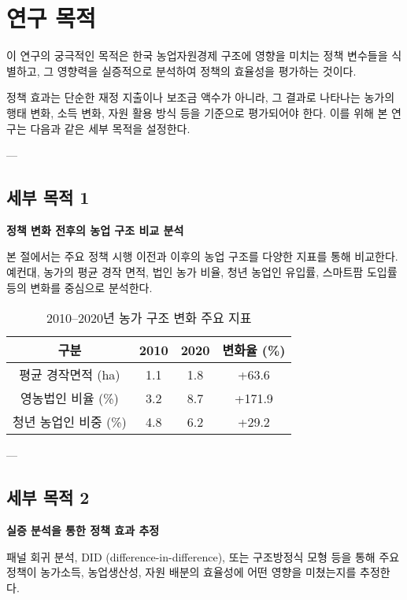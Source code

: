 \section{연구 목적}

이 연구의 궁극적인 목적은 한국 농업자원경제 구조에 영향을 미치는 정책 변수들을 식별하고,  
그 영향력을 실증적으로 분석하여 정책의 효율성을 평가하는 것이다.  

정책 효과는 단순한 재정 지출이나 보조금 액수가 아니라,  
그 결과로 나타나는 농가의 행태 변화, 소득 변화, 자원 활용 방식 등을 기준으로 평가되어야 한다.  
이를 위해 본 연구는 다음과 같은 세부 목적을 설정한다.

---

\subsection{세부 목적 1}

\textbf{정책 변화 전후의 농업 구조 비교 분석}  

본 절에서는 주요 정책 시행 이전과 이후의 농업 구조를 다양한 지표를 통해 비교한다.  
예컨대, 농가의 평균 경작 면적, 법인 농가 비율, 청년 농업인 유입률, 스마트팜 도입률 등의 변화를 중심으로 분석한다.

\begin{table}[htbp]
  \centering
  \begin{tabular}{|c|c|c|c|}
    \hline
    구분 & 2010 & 2020 & 변화율 (\%) \\
    \hline
    평균 경작면적 (ha) & 1.1 & 1.8 & +63.6 \\
    영농법인 비율 (\%) & 3.2 & 8.7 & +171.9 \\
    청년 농업인 비중 (\%) & 4.8 & 6.2 & +29.2 \\
    \hline
  \end{tabular}
  \caption{2010–2020년 농가 구조 변화 주요 지표}\label{tab:chapter1_2}
\end{table}

---

\subsection{세부 목적 2}

\textbf{실증 분석을 통한 정책 효과 추정}  

패널 회귀 분석, DID (difference-in-difference), 또는 구조방정식 모형 등을 통해  
주요 정책이 농가소득, 농업생산성, 자원 배분의 효율성에 어떤 영향을 미쳤는지를 추정한다.  

